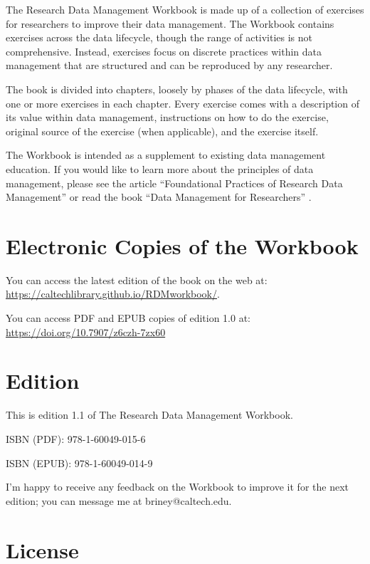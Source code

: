 \documentclass[
]{book}
\begin{document}
The Research Data Management Workbook is made up of a collection of exercises for researchers to improve their data management. The Workbook contains exercises across the data lifecycle, though the range of activities is not comprehensive. Instead, exercises focus on discrete practices within data management that are structured and can be reproduced by any researcher.

The book is divided into chapters, loosely by phases of the data lifecycle, with one or more exercises in each chapter. Every exercise comes with a description of its value within data management, instructions on how to do the exercise, original source of the exercise (when applicable), and the exercise itself.

The Workbook is intended as a supplement to existing data management education. If you would like to learn more about the principles of data management, please see the article ``Foundational Practices of Research Data Management'' \citep{briney_foundational_2020} or read the book ``Data Management for Researchers'' \citep{briney_data_2015}.

\hypertarget{electronic-copies-of-the-workbook}{%
\section*{Electronic Copies of the Workbook}\label{electronic-copies-of-the-workbook}}

You can access the latest edition of the book on the web at: \url{https://caltechlibrary.github.io/RDMworkbook/}.

You can access PDF and EPUB copies of edition 1.0 at: \url{https://doi.org/10.7907/z6czh-7zx60}

\hypertarget{edition}{%
\section*{Edition}\label{edition}}

This is edition 1.1 of The Research Data Management Workbook.

ISBN (PDF): 978-1-60049-015-6

ISBN (EPUB): 978-1-60049-014-9

I'm happy to receive any feedback on the Workbook to improve it for the next edition; you can message me at briney@caltech.edu.

\hypertarget{license}{%
\section*{License}\label{license}}
\end{document}
